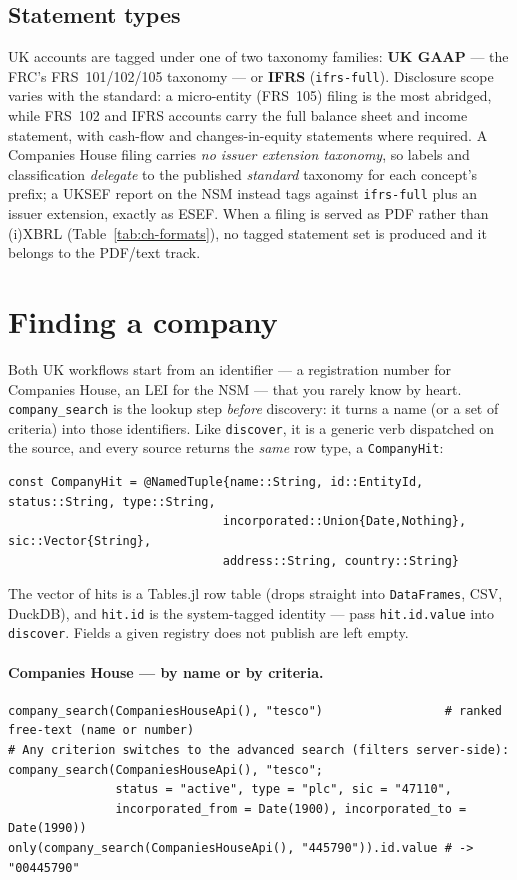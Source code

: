 \documentclass[11pt,a4paper]{report}
\begin{document}
\subsection{Statement types}
UK accounts are tagged under one of two taxonomy families: \textbf{UK GAAP} --- the FRC's FRS~101/102/105
taxonomy --- or \textbf{IFRS} (\texttt{ifrs-full}). Disclosure scope varies with the standard: a
micro-entity (FRS~105) filing is the most abridged, while FRS~102 and IFRS accounts carry the full balance
sheet and income statement, with cash-flow and changes-in-equity statements where required. A Companies
House filing carries \emph{no issuer extension taxonomy}, so labels and classification \emph{delegate} to
the published \emph{standard} taxonomy for each concept's prefix; a UKSEF report on the NSM instead tags
against \texttt{ifrs-full} plus an issuer extension, exactly as ESEF. When a filing is served as PDF rather
than (i)XBRL (Table~\ref{tab:ch-formats}), no tagged statement set is produced and it belongs to the
PDF/text track.

\section{Finding a company}
\label{sec:uk-company-search}

Both UK workflows start from an identifier --- a registration number for Companies House, an LEI for
the NSM --- that you rarely know by heart. \texttt{company\_search} is the lookup step \emph{before}
discovery: it turns a name (or a set of criteria) into those identifiers. Like \texttt{discover}, it is
a generic verb dispatched on the source, and every source returns the \emph{same} row type, a
\texttt{CompanyHit}:

\begin{lstlisting}
const CompanyHit = @NamedTuple{name::String, id::EntityId, status::String, type::String,
                              incorporated::Union{Date,Nothing}, sic::Vector{String},
                              address::String, country::String}
\end{lstlisting}

\noindent The vector of hits is a Tables.jl row table (drops straight into \texttt{DataFrames}, CSV,
DuckDB), and \texttt{hit.id} is the system-tagged identity --- pass \texttt{hit.id.value} into
\texttt{discover}. Fields a given registry does not publish are left empty.

\paragraph{Companies House --- by name or by criteria.}
\begin{lstlisting}
company_search(CompaniesHouseApi(), "tesco")                 # ranked free-text (name or number)
# Any criterion switches to the advanced search (filters server-side):
company_search(CompaniesHouseApi(), "tesco";
               status = "active", type = "plc", sic = "47110",
               incorporated_from = Date(1900), incorporated_to = Date(1990))
only(company_search(CompaniesHouseApi(), "445790")).id.value # -> "00445790"
\end{lstlisting}
\end{document}
